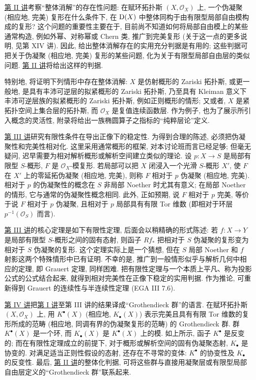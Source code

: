 \hyperlink{sga6.e02.expose}{第 II 讲}考察“整体消解”的存在性问题: 在赋环拓扑斯 \((X,\mathcal O_X)\) 上, 一个伪凝聚 (相应地, 完美) 复形在什么条件下, 在 \(\mathrm D(X)\) 中整体同构于由有限型局部自由模构成的复形? 这个问题的重要性主要在于, 目前尚不知道如何将局部自由模上的某些通常构造, 例如外幂、对称幂或 Chern 类, 推广到完美复形 (关于这一点的更多说明, 见第 XIV 讲). 因此, 给出整体消解存在的实用充分判据是有用的; 这些判据可把关于伪凝聚 (相应地, 完美) 复形的某些问题, 化为关于有限型局部自由层的类似问题. \hyperlink{sga6.e02.expose}{第 II 讲}将给出这样的判据.

特别地, 将证明下列情形中存在整体消解: \(X\) 是仿射概形的 Zariski 拓扑斯, 或更一般地, 是具有丰沛可逆层的拟紧概形的 Zariski 拓扑斯, 乃至具有 Kleiman 意义下丰沛可逆层族的拟紧概形的 Zariski 拓扑斯, 例如正则概形的情形; 又或者, \(X\) 是紧拓扑空间上集合层的拓扑斯, 而 \(\mathcal O_X\) 是复值连续函数层. 作为例子, 也为了展示所引入概念的灵活性, 附录将给出一族椭圆算子之指标的“纯粹层论”定义.

\hyperlink{sga6.e03.expose}{第 III 讲}研究有限性条件在导出正像下的稳定性. 为得到合理的陈述, 必须把伪凝聚性和完美性相对化. 这里采用通常概形的框架, 对本讨论班而言已经足够; 但毫无疑问, 迟早需要为相对解析概形或解析空间建立类似的理论. 设 \(p:X\to S\) 是局部有限型 \(S\)-概形, \(F\) 是 \(\mathcal O_X\)-模复形. 若局部可以把 \(X\) 闭浸入一个光滑 \(S\)-概形 \(X'\), 使 \(F\) 在 \(X'\) 上的零延拓伪凝聚 (相应地, 完美), 则称 \(F\) 相对于 \(p\) 伪凝聚 (相应地, 完美). 相对于 \(p\) 的伪凝聚性的概念在 \(S\) 非局部 Noether 时尤其有意义; 在局部 Noether 的情形, 它与通常的伪凝聚性概念相同. 此外, 正如预期, 说 \(F\) 相对于 \(p\) 完美, 等价于说 \(F\) 相对于 \(p\) 伪凝聚, 且相对于 \(p\) 局部具有有限 Tor 维数 (即相对于环层 \(p^{-1}(\mathcal O_S)\) 而言).

\hyperlink{sga6.e03.expose}{第 III 讲}的核心定理是如下有限性定理, 后面会以稍精确的形式陈述: 若 \(f:X\to Y\) 是局部有限型 \(S\)-概形之间的固有态射, 则函子 \(Rf_*\) 把相对于 \(S\) 伪凝聚的复形变为相对于 \(S\) 伪凝聚的复形. 这个定理实际上是一个猜想, 但在 \(S\) 局部 Noether 和 \(f\) 射影这两个特殊情形中已有证明. 不幸的是, 推广到一般情形似乎与解析几何中相应的定理, 即 Grauert 定理, 同样困难. 把有限性定理与一个本质上平凡、称为投影公式的公式结合起来, 就得到相对完美性在正像下稳定的实用判据. 作为推论, 可重新得到 Grauert 的连续性与半连续性定理 (EGA III 7.6).

\hyperlink{sga6.e04.expose}{第 IV 讲}把\hyperlink{sga6.e01.expose}{第 I 讲}至第 III 讲的结果译成“Grothendieck 群”的语言. 在赋环拓扑斯 \((X,\mathcal O_X)\) 上, 用 \(K^\bullet(X)\) (相应地, \(K_\bullet(X)\)) 表示完美且具有有限 Tor 维数的复形所成的范畴 (相应地, 同调有界的伪凝聚复形的范畴) 的 Grothendieck 群. 群 \(K^\bullet(X)\) 是一个环, 而 \(K_\bullet(X)\) 是 \(K^\bullet(X)\) 上的模. 如上所示, 函子 \(K^\bullet\) 是反变的; 而在有限性定理成立的前提下, 对于概形或解析空间的固有伪凝聚态射, \(K_\bullet\) 是协变的. 对满足适当正则性假设的态射, 还存在不寻常的变体: \(K^\bullet\) 的协变性及 \(K_\bullet\) 的反变性. 最后, \hyperlink{sga6.e02.expose}{第 II 讲}的整体化判据, 可将这些群与直接用凝聚层或有限型局部自由层定义的“Grothendieck 群”联系起来.

